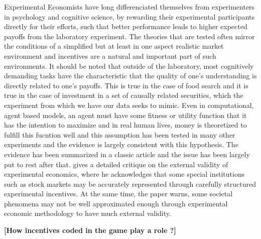 Experimental Economists have long differenciated themselves from experimenters in psychology and cognitive science, by rewarding their experimental participants directly for their efforts, such that better performance leads to higher expected payoffs from the laboratory experiment. The theories that are tested often mirror the conditions of a simplified but at least in one aspect realistic market environment and incentives are a natural and important part of such environments. It should be noted that outside of the laboratory, most cognitively demanding tasks have the characteristic that the quality of one's understanding is directly related to one's payoffs. This is true in the case of food search and it is true in the case of investment in a set of causally related securities, which the experiment from which we have our data seeks to mimic. Even in computational, agent based models, an agent must have some fitness or utility function that it has the intention to maximize \cite{dennett1989intentional} and in real human lives, money is theoretized to fulfill this fucntion well and this assumption has been tested in many other experiments and the evidence is largely consistent with this hypothesis.  The evidence has been summarized in a classic article \cite{smith1993} and the issue has been largely put to rest after that.    \cite{loewenstein99} gives a detailed critique on the external validity of experimental economics, where he acknowledges that some special institutions such as stock markets may be accurately represented through carefully structured experimental incentives. At the same time, the paper warns, some societal phenomena may not be well approximated enough through experimental economic methodology to have much external validity.   


{\bf [How incentives coded in the game play a role ?]}
